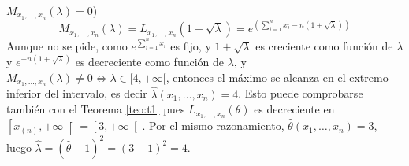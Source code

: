 \documentclass[12pt]{article}
\begin{document}
\begin{ejercicio}
\begin{enumerate}
            $M_{x_1, \ldots, x_n}(\lambda) = 0$)
            $$M_{x_1, \ldots, x_n}(\lambda) = L_{x_1, \ldots, x_n} (1 + \sqrt{\lambda}) = e^{\left(\displaystyle\sum_{i=1}^n x_i - n (1 + \sqrt{\lambda}) \right)}$$
            Aunque no se pide, como $e^{\sum_{i=1}^n x_i}$ es fijo, y $1 + \sqrt{\lambda}$ es creciente como función de $\lambda$ y 
            $e^{-n(1+\sqrt{\lambda})}$ es decreciente como función de $\lambda$, y $M_{x_1, \ldots, x_n}(\lambda) \neq 0 \iff \lambda \in [4, +\infty[$, entonces
            el máximo se alcanza en el extremo inferior del intervalo, es decir $\hat{\lambda}(x_1, \ldots, x_n) = 4$. Esto puede comprobarse también con el 
            Teorema \ref{teo:t1} pues $L_{x_1, \ldots, x_n}(\theta)$ es decreciente en $\left[x_{(n)}, +\infty \right[ = 
            \left[3, + \infty \right[$. Por el mismo razonamiento, $\hat{\theta}(x_1, \ldots, x_n) = 3$, luego $\hat{\lambda} = (\hat{\theta} - 1)^2 = (3-1)^2 = 4$.
        \end{enumerate}
    \end{ejercicio}

    \newpage
\end{document}
